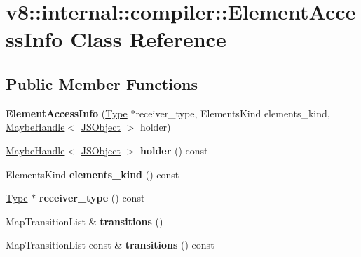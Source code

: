\hypertarget{classv8_1_1internal_1_1compiler_1_1_element_access_info}{}\section{v8\+:\+:internal\+:\+:compiler\+:\+:Element\+Access\+Info Class Reference}
\label{classv8_1_1internal_1_1compiler_1_1_element_access_info}
\subsection*{Public Member Functions}
\begin{DoxyCompactItemize}
\item 
{\bfseries Element\+Access\+Info} (\hyperlink{classv8_1_1internal_1_1_type}{Type} $\ast$receiver\+\_\+type, Elements\+Kind elements\+\_\+kind, \hyperlink{classv8_1_1internal_1_1_maybe_handle}{Maybe\+Handle}$<$ \hyperlink{classv8_1_1internal_1_1_j_s_object}{J\+S\+Object} $>$ holder)\hypertarget{classv8_1_1internal_1_1compiler_1_1_element_access_info_ad3c8c5b626af8968b123541139c6c3ff}{}\label{classv8_1_1internal_1_1compiler_1_1_element_access_info_ad3c8c5b626af8968b123541139c6c3ff}

\item 
\hyperlink{classv8_1_1internal_1_1_maybe_handle}{Maybe\+Handle}$<$ \hyperlink{classv8_1_1internal_1_1_j_s_object}{J\+S\+Object} $>$ {\bfseries holder} () const \hypertarget{classv8_1_1internal_1_1compiler_1_1_element_access_info_af2109bf71e04ab768134e56fd68ca90d}{}\label{classv8_1_1internal_1_1compiler_1_1_element_access_info_af2109bf71e04ab768134e56fd68ca90d}

\item 
Elements\+Kind {\bfseries elements\+\_\+kind} () const \hypertarget{classv8_1_1internal_1_1compiler_1_1_element_access_info_a6177677ec77c7524e7051f8f7a0250fc}{}\label{classv8_1_1internal_1_1compiler_1_1_element_access_info_a6177677ec77c7524e7051f8f7a0250fc}

\item 
\hyperlink{classv8_1_1internal_1_1_type}{Type} $\ast$ {\bfseries receiver\+\_\+type} () const \hypertarget{classv8_1_1internal_1_1compiler_1_1_element_access_info_a69c74055efbcd6e7811b63ce95b964ec}{}\label{classv8_1_1internal_1_1compiler_1_1_element_access_info_a69c74055efbcd6e7811b63ce95b964ec}

\item 
Map\+Transition\+List \& {\bfseries transitions} ()\hypertarget{classv8_1_1internal_1_1compiler_1_1_element_access_info_a03ecd9574b5ed3fd67c9f3c6f0f1533e}{}\label{classv8_1_1internal_1_1compiler_1_1_element_access_info_a03ecd9574b5ed3fd67c9f3c6f0f1533e}

\item 
Map\+Transition\+List const \& {\bfseries transitions} () const \hypertarget{classv8_1_1internal_1_1compiler_1_1_element_access_info_a0419389e2e63538eb62c8bad28b76a5a}{}\label{classv8_1_1internal_1_1compiler_1_1_element_access_info_a0419389e2e63538eb62c8bad28b76a5a}

\end{DoxyCompactItemize}
